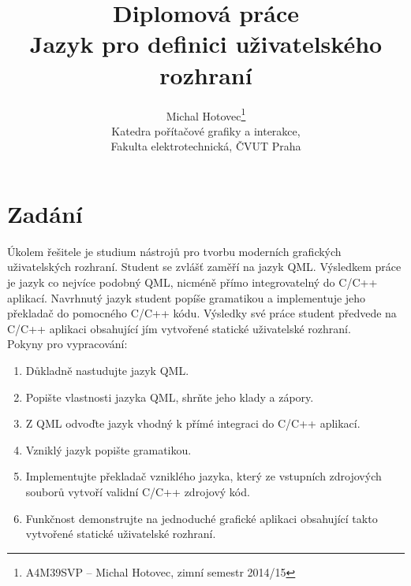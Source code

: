 \documentclass[report,11pt]{elsarticle}
\begin{document}
\begin{frontmatter}

\title{Diplomová práce\\ Jazyk pro definici uživatelského rozhraní}

\author{Michal Hotovec\footnote{A4M39SVP -- Michal Hotovec, zimní semestr 2014/15}\\
Katedra pořítačové grafiky a interakce,\\ Fakulta elektrotechnická, ČVUT Praha
}

\date{}



\end{frontmatter}



\section{\label{SEC:Intro}Zadání}
Úkolem řešitele je studium nástrojů pro tvorbu moderních grafických uživatelských rozhraní.
Student se zvlášť zaměří na jazyk QML. Výsledkem práce je jazyk co nejvíce podobný QML,
nicméně přímo integrovatelný do C/C++ aplikací. Navrhnutý jazyk student popíše gramatikou a
implementuje jeho překladač do pomocného C/C++ kódu. Výsledky své práce student předvede na
C/C++ aplikaci obsahující jím vytvořené statické uživatelské rozhraní.\\
Pokyny pro vypracování:
\begin{enumerate}
\item Důkladně nastudujte jazyk QML.
\item Popište vlastnosti jazyka QML, shrňte jeho klady a zápory.
\item Z QML odvoďte jazyk vhodný k přímé integraci do C/C++ aplikací.
\item Vzniklý jazyk popište gramatikou.
\item Implementujte překladač vzniklého jazyka, který ze vstupních zdrojových souborů vytvoří
validní C/C++ zdrojový kód.
\item Funkčnost demonstrujte na jednoduché grafické aplikaci obsahující takto vytvořené statické
uživatelské rozhraní.
\end{enumerate}
\end{document}
